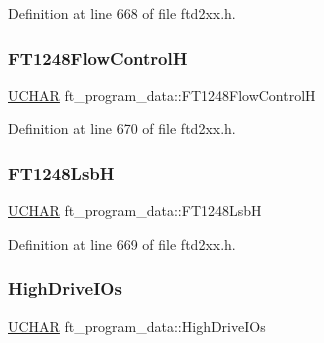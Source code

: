 Definition at line 668 of file ftd2xx.\+h.

\mbox{\label{structft__program__data_accb9f60cb1450ffd7d942e95729188ed}} 
\subsubsection{\texorpdfstring{F\+T1248\+Flow\+ControlH}{FT1248FlowControlH}}
{\footnotesize\ttfamily \hyperlink{CatCaloProto40MHz_2inc_2WinTypes_8h_a4f4bb67531a9bf6f0b9c6ad76aeba587}{U\+C\+H\+AR} ft\+\_\+program\+\_\+data\+::\+F\+T1248\+Flow\+ControlH}



Definition at line 670 of file ftd2xx.\+h.

\mbox{\label{structft__program__data_a4088d357bd88bee7c601fa525a9175ea}} 
\subsubsection{\texorpdfstring{F\+T1248\+LsbH}{FT1248LsbH}}
{\footnotesize\ttfamily \hyperlink{CatCaloProto40MHz_2inc_2WinTypes_8h_a4f4bb67531a9bf6f0b9c6ad76aeba587}{U\+C\+H\+AR} ft\+\_\+program\+\_\+data\+::\+F\+T1248\+LsbH}



Definition at line 669 of file ftd2xx.\+h.

\mbox{\label{structft__program__data_a0f53600aee9f86d6286ecd0803f71825}} 
\subsubsection{\texorpdfstring{High\+Drive\+I\+Os}{HighDriveIOs}}
{\footnotesize\ttfamily \hyperlink{CatCaloProto40MHz_2inc_2WinTypes_8h_a4f4bb67531a9bf6f0b9c6ad76aeba587}{U\+C\+H\+AR} ft\+\_\+program\+\_\+data\+::\+High\+Drive\+I\+Os}




